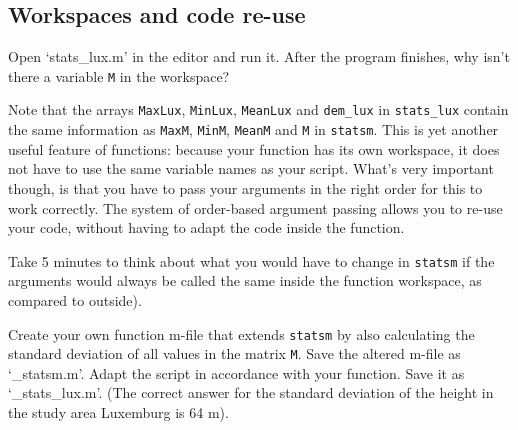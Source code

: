 \subsection{Workspaces and code re-use}
\begin{action}
Open `stats\_lux.m' in the editor and run it. After the program finishes, why isn't there a variable {\tt M} in the workspace?
\end{action}
Note that the arrays {\tt MaxLux}, {\tt MinLux}, {\tt MeanLux} and {\tt dem\_lux} in {\tt stats\_lux} contain the same information as {\tt MaxM}, {\tt MinM}, {\tt MeanM} and {\tt M} in {\tt statsm}. This is yet another useful feature of functions: because your function has its own workspace, it does not have to use the same variable names as your script. What's very important though, is that you have to pass your arguments in the right order for this to work correctly. The system of order-based argument passing allows you to re-use your code, without having to adapt the code inside the function. 
\begin{action}
Take 5 minutes to think about what you would have to change in {\tt statsm} if the arguments would always be called the same inside the function workspace, as compared to outside).
\end{action}


%
%



\begin{action}
Create your own function m-file that extends {\tt statsm} by also calculating the standard deviation of all values in the matrix {\tt M}. Save the altered m-file as `\_statsm.m'. Adapt the script in accordance with your function. Save it as `\_stats\_lux.m'. (The correct answer for the standard deviation of the height in the study area Luxemburg is 64 m).
\end{action}



